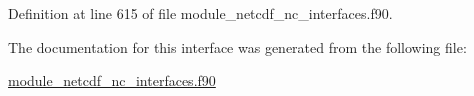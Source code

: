 Definition at line 615 of file module\+\_\+netcdf\+\_\+nc\+\_\+interfaces.\+f90.



The documentation for this interface was generated from the following file\+:\begin{DoxyCompactItemize}
\item 
\hyperlink{module__netcdf__nc__interfaces_8f90}{module\+\_\+netcdf\+\_\+nc\+\_\+interfaces.\+f90}\end{DoxyCompactItemize}
